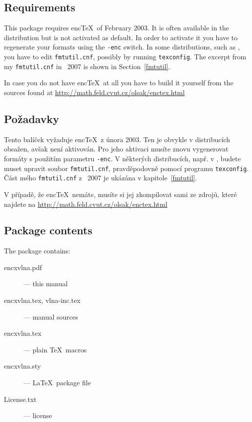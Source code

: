 
\ifeng

\subsection{Requirements}
This package requires enc\TeX\ of February 2003. It is often available in the distribution but is
not activated as default. In order to activate it you have to regenerate your formats using the
\texttt{-enc} switch. In some distributions, such as \TL, you have to edit
\texttt{fmtutil.cnf}, possibly by running \texttt{texconfig}. The excerpt from my
\texttt{fmtutil.cnf} in \TL~2007 is shown in Section~\ref{fmtutil}.

In case you do not have enc\TeX\ at all you have to build it yourself from the sources found at
\url{http://math.feld.cvut.cz/olsak/enctex.html}

\else

\subsection{\texorpdfstring{Požadavky}{Pozadavky}}
Tento balíček vyžaduje enc\TeX\ z února 2003. Ten je obvykle v distribucích obsažen, avšak není
aktivován. Pro jeho aktivaci musíte znovu vygenerovat formáty s použitím parametru \texttt{-enc}. V
některých distribucích, např. v \TL, budete muset upravit soubor \texttt{fmtutil.cnf},
pravděpodovně pomocí programu \texttt{texconfig}. Část mého \texttt{fmtutil.cnf} z \TL~2007
je ukázána v kapitole~\ref{fmtutil}.

V případě, že enc\TeX\ nemáte, musíte si jej zkompilovat sami ze zdrojů, které najdete na
\url{http://math.feld.cvut.cz/olsak/enctex.html}

\fi


\ifeng

\subsection{Package contents}
The package contains:
\begin{description}
\item[encxvlna.pdf] --- this manual
\item[encxvlna.tex, vlna-inc.tex] --- manual sources
\item[encxvlna.tex] --- plain \TeX\ macros
\item[encxvlna.sty] --- \LaTeX\ package file
\item[License.txt] --- license
\end{description}

